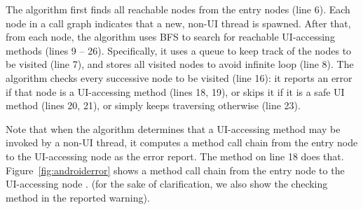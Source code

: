 The algorithm first finds all reachable 
nodes from the entry nodes (line 6).
Each  node in a call graph indicates that a new,
non-UI thread is spawned.  After that, from each 
node, the algorithm uses BFS to search for reachable UI-accessing
methods (lines 9 -- 26).
Specifically, it uses a queue to keep track of the nodes to be visited (line 7),
and stores all visited nodes to avoid infinite loop (line 8).
The algorithm checks every successive node to be visited (line 16):
it reports an error if that node is a UI-accessing method (lines 18, 19), or skips
it if it is a safe UI method (lines 20, 21), or simply keeps traversing otherwise (line 23).

Note that when the algorithm determines that a UI-accessing method may be invoked
by a non-UI thread, it computes a method call chain from the entry node to
the UI-accessing node as the error report.
The method  on line 18 does that. 
Figure~\ref{fig:androiderror} shows a method call chain from the entry
node  to the UI-accessing node .
(for the sake of clarification, we also show the checking method  in the reported warning).





